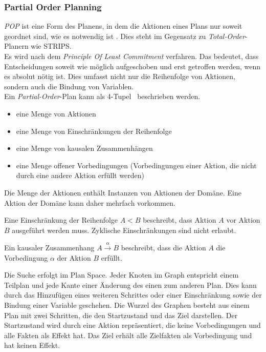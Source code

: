 \subsubsection{Partial Order Planning}{\label{section:pop}}
\emph{\acf{POP}} ist eine Form des Planens, in dem die Aktionen eines Plans nur soweit geordnet sind, wie es notwendig ist \cite{dyer_2003}.
Dies steht im Gegensatz zu \emph{Total-Order}-Planern wie \ac{STRIPS}.\\
Es wird nach dem \emph{Principle Of Least Commitment} verfahren.
Das bedeutet, dass Entscheidungen soweit wie möglich aufgeschoben und erst getroffen werden, wenn es absolut nötig ist.
Dies umfasst nicht nur die Reihenfolge von Aktionen, sondern auch die Bindung von Variablen.\\
Ein \emph{Partial-Order}-Plan kann als 4-Tupel~\cite{grastien} beschrieben werden.
\begin{itemize}
    \item eine Menge von Aktionen
    \item eine Menge von Einschränkungen der Reihenfolge
    \item eine Menge von kausalen Zusammenhängen
    \item eine Menge offener Vorbedingungen (Vorbedingungen einer Aktion, die nicht durch eine andere Aktion erfüllt werden)
\end{itemize}
Die Menge der Aktionen enthält Instanzen von Aktionen der Domäne.
Eine Aktion der Domäne kann daher mehrfach vorkommen.
\begin{definition}
    Eine Einschränkung der Reihenfolge $A < B$ beschreibt, dass Aktion $A$ vor Aktion $B$ ausgeführt werden muss.
    Zyklische Einschränkungen sind nicht erlaubt.
\end{definition}
\begin{definition}
    Ein kausaler Zusammenhang $A \xrightarrow{\alpha} B$ beschreibt, dass die Aktion $A$ die Vorbedingung $\alpha$ der Aktion $B$ erfüllt.
\end{definition}
Die Suche erfolgt im Plan Space.
Jeder Knoten im Graph entspricht einem Teilplan und jede Kante einer Änderung des einen zum anderen Plan.
Dies kann durch das Hinzufügen eines weiteren Schrittes oder einer Einschränkung sowie der Bindung einer Variable geschehen.
Die Wurzel des Graphen besteht aus einem Plan mit zwei Schritten, die den Startzustand und das Ziel darstellen.
Der Startzustand wird durch eine Aktion repräsentiert, die keine Vorbedingungen und alle Fakten als Effekt hat.
Das Ziel erhält alle Zielfakten als Vorbedingung und hat keinen Effekt.
